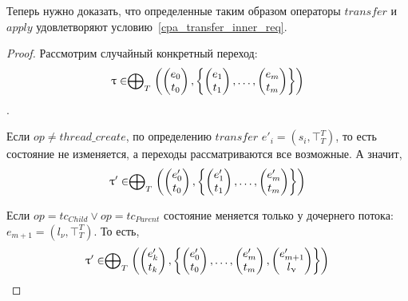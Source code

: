 Теперь нужно доказать, что определенные таким образом операторы $transfer$ и $apply$ удовлетворяют условию~\ref{cpa_transfer_inner_req}.

\begin{proof}
Рассмотрим случайный конкретный переход:
$$\uptau \in  \mathrel{\bigoplus}_{T}
\left(
\begin{pmatrix}
e_0 \\
t_0 
\end{pmatrix},
\left\{
\begin{pmatrix}
e_1 \\
t_1 
\end{pmatrix},
\dots ,
\begin{pmatrix}
e_m \\
t_m 
\end{pmatrix}
\right\}
\right)$$.

Если $op \neq thread\_create$, по определению $transfer$ $e'_i = (s_i, \top^T_T)$, то есть состояние не изменяется, а переходы рассматриваются все возможные. 
А значит, 
$$\uptau' \in  \mathrel{\bigoplus}_{T}
\left(
\begin{pmatrix}
e'_0 \\
t_0 
\end{pmatrix},
\left\{
\begin{pmatrix}
e'_1 \\
t_1 
\end{pmatrix},
\dots ,
\begin{pmatrix}
e'_m \\
t_m 
\end{pmatrix}
\right\}
\right)$$

Если $op = tc_{Child} \lor op = tc_{Parent}$ состояние меняется только у дочернего потока: $e_{m+1} = (l_{\nu}, \top^T_T)$.
То есть, 
$$\uptau' \in  \mathrel{\bigoplus}_{T}
\left(
\begin{pmatrix}
e'_k \\
t_k 
\end{pmatrix},
\left\{
\begin{pmatrix}
e'_0 \\
t_0 
\end{pmatrix},
\dots ,
\begin{pmatrix}
e'_m \\
t_m 
\end{pmatrix} ,
\begin{pmatrix}
e'_{m+1} \\
l_{\upnu} 
\end{pmatrix}
\right\}
\right)$$

\end{proof}


